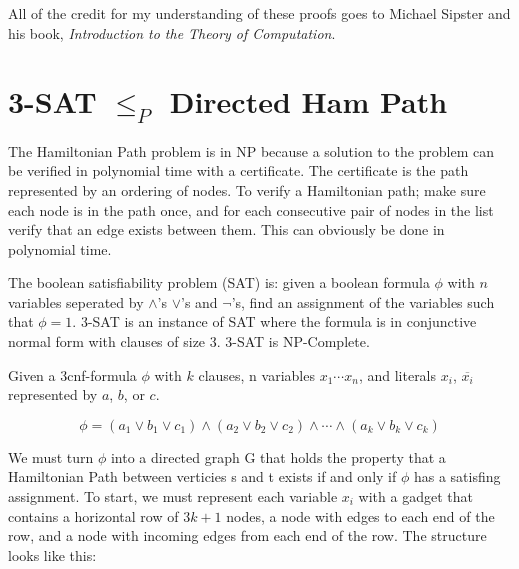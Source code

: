 \documentclass[11pt]{article}
\begin{document}
All of the credit for my understanding of these proofs goes to Michael Sipster and his book, \emph{Introduction
to the Theory of Computation}.

\section{3-SAT $\leq_{P}$ Directed Ham Path}
The Hamiltonian Path problem is in NP because a solution to the problem can be verified 
in polynomial time with a certificate. The certificate is the path represented by an 
ordering of nodes. To verify a Hamiltonian path; make sure each node is in the path once, and for each consecutive pair of nodes in the list verify that an edge exists between
them. This can obviously be done in polynomial time.

The boolean satisfiability problem (SAT) is: given a boolean formula $\phi$ with $n$
variables seperated by $\land$'s $\lor$'s and $\neg$'s, find an assignment of the 
variables such that $\phi = 1$. 3-SAT is an instance of SAT where the formula is in conjunctive normal form
with clauses of size 3. 3-SAT is NP-Complete.

Given a 3cnf-formula $\phi$ with $k$ clauses, n variables $x_{1} \cdots x_{n}$, and 
literals $x_{i}$, $\overline{x_{i}}$ represented by $a$, $b$, or $c$.

$$
\phi = (a_{1} \lor b_{1} \lor c_{1}) \land (a_{2} \lor b_{2} \lor c_{2}) 
\land \cdots \land (a_{k} \lor b_{k} \lor c_{k})
$$

We must turn $\phi$ into a directed graph G that holds the 
property that a Hamiltonian Path between verticies s and t exists if and only if $\phi$ has a 
satisfing assignment. To start, we must represent each variable $x_{i}$ with a gadget that
contains a horizontal row of $3k + 1$ nodes, a node with edges to each end of the row, and
a node with incoming edges from each end of the row. The structure looks like this:

\begin{center}
\end{center}
\end{document}
